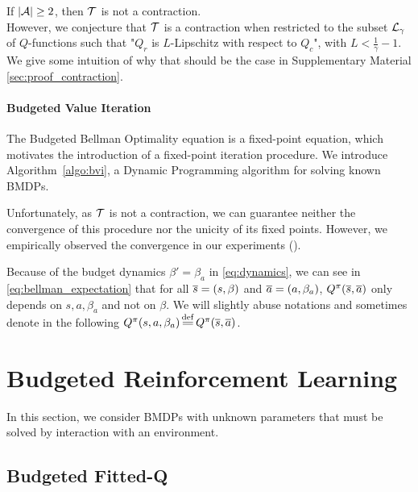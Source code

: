 \documentclass{article}
\begin{document}
\begin{theorem}[Contractivity of $\cT$]
\label{thm:contraction}
If $|\mathcal{A}| \geq 2$, then $\cT$ is not a contraction.\\
However, we conjecture that $\cT$ is a contraction when restricted to the subset $\mathcal{L}_\gamma$ of $Q$-functions such that "$Q_r$ is $L$-Lipschitz with respect to $Q_c$", with $L<\frac{1}{\gamma}-1$. We give some intuition of why that should be the case in Supplementary Material \ref{sec:proof_contraction}.
\end{theorem}

\paragraph{Budgeted Value Iteration}
{
The Budgeted Bellman Optimality equation is a fixed-point equation, which motivates the introduction of a fixed-point iteration procedure. We introduce Algorithm~\ref{algo:bvi}, a Dynamic Programming algorithm for solving known BMDPs.

Unfortunately, as $\cT$ is not a contraction, we can guarantee neither the convergence of this procedure nor the unicity of its fixed points. However, we empirically observed the convergence in our experiments ().
}

Because of the budget dynamics $\beta' = \beta_a$ in \eqref{eq:dynamics}, we can see in \eqref{eq:bellman_expectation} that for all $\overline{s}=(s, \beta)$ and $\overline{a}=(a, \beta_a)$, $Q^\pi(\overline{s}, \overline{a})$ only depends on $s, a, \beta_a$ and not on $\beta$. We will slightly abuse notations and sometimes denote in the following $Q^\pi(s, a, \beta_a) \eqdef Q^\pi(\os, \oa)$.

\section{Budgeted Reinforcement Learning}

In this section, we consider BMDPs with unknown parameters that must be solved by interaction with an environment. 

\subsection{Budgeted Fitted-Q}
\end{document}
